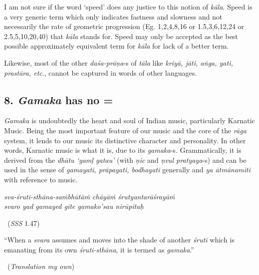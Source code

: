 \newpage

I am not sure if the word ‘speed’ does any justice to this notion of \textit{kāla}. Speed is a very generic term which only indicates fastness and slowness and not necessarily the rate of geometric progression (Eg. 1,2,4,8,16 or 1.5,3,6,12,24 or 2.5,5,10,20,40) that \textit{kāla} stands for. Speed may only be accepted as the best possible approximately equivalent term for \textit{kāla} for lack of a better term.

Likewise, most of the other \textit{daśa-prāṇa}-s of \textit{tāla} like \textit{kriyā, jāti, aṅga, yati, prastāra, etc}., cannot be captured in words of other languages.


\subsection*{8. \textit{Gamaka} has no =}

\textit{Gamaka} is undoubtedly the heart and soul of Indian music, particularly Karnatic Music. Being the most important feature of our music and the core of the \textit{rāga} system, it lends to our music its distinctive character and personality. In other words, Karnatic music is what it is, due to its \textit{gamaka}-s. Grammatically, it is derived from the \textit{dhātu ‘gamḷ gatau’} (with \textit{ṇic} and \textit{ṇvul pratyaya}-s) and can be used in the sense of \textit{gamayati, prāpayati, bodhayati} generally and \textit{ya ātmānamiti} with reference to music.

\begin{myquote}
\textit{sva-śruti-sthāna-saṁbhūtāṁ chāyāṁ śrutyantarāśrayāṁ }\\ \textit{svaro yad gamayed gīte gamako’sau nirūpitaḥ } 

~\hfill (\textit{SSS} 1.47)
\end{myquote}

\begin{myquote}
“When a \textit{svara} assumes and moves into the shade of another \textit{śruti} which is emanating from its own \textit{śruti-sthāna}, it is termed as \textit{gamaka}.” 

~\hfill (\textit{Translation my own})
\end{myquote}

